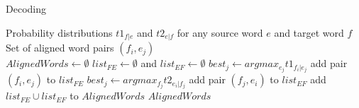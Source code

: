 \documentclass[11pt]{article}
\begin{document}
\begin{algorithm}[htb]
	\renewcommand{\algorithmicrequire}{\textbf{Input:}\hspace{10.7pt}}
	\renewcommand\algorithmicensure {\textbf{Output:} }
	\caption{Decoding}
	\label{alg:pbg}
		\begin{algorithmic}[1]
		\vspace{3pt}
		\REQUIRE
		Probability distributions $t1_{f|e}$ and $t2_{e|f}$ 
		for any source word $e$ and target word $f$\\
		\ENSURE Set of aligned word pairs $(f_i,e_j)$\\
		\STATE $AlignedWords \gets \emptyset$
			\STATE $list_{FE} \gets \emptyset$ and $list_{EF} \gets \emptyset$
			 	\STATE $best_j \gets argmax_{e_j} t1_{f_i|e_j}$
			  	\STATE add pair $(f_i,e_j)$ to $list_{FE}$
			\ENDFOR
			 	\STATE $best_j \gets argmax_{f_j} t2_{e_i|f_j}$
			  	\STATE add pair $(f_j,e_i)$ to $list_{EF}$
			\ENDFOR
			\STATE add $list_{FE} \cup list_{EF}$ to $AlignedWords$
		\ENDFOR
	    \RETURN $AlignedWords$ 
	\end{algorithmic}
\end{algorithm}
\end{document}
